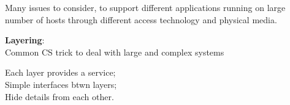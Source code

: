 \documentclass[20pt,handout,notes=show]{beamer}
\begin{document}
\begin{frame}\begin{center}\normalsize
Many issues to consider, to support different applications running on large number of hosts through different access technology and physical media.
\end{center}\end{frame}


\begin{frame}\begin{center}\large
\textbf{Layering}:\\Common CS trick to deal with large and complex systems
\end{center}\end{frame}

\begin{frame}\begin{center}\large
Each layer provides a service;\\ Simple interfaces btwn layers;\\ Hide details from each other.
\end{center}\end{frame}

\begin{frame}[plain]
\end{frame}
\end{document}

